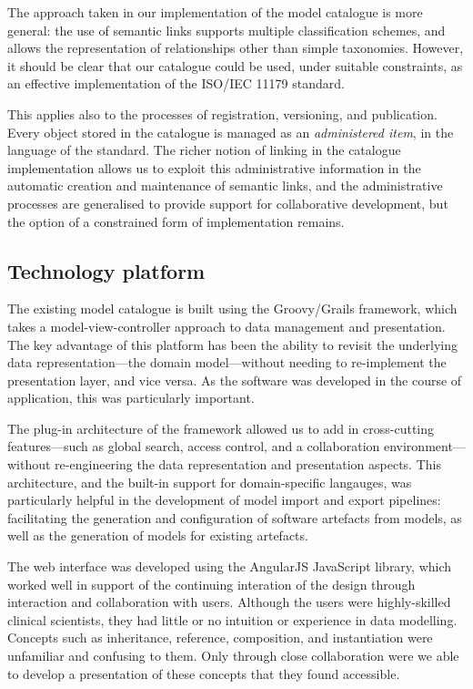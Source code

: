 The approach taken in our implementation of the model catalogue is
more general: the use of semantic links supports multiple
classification schemes, and allows the representation of relationships
other than simple taxonomies.  However, it should be clear that our
catalogue could be used, under suitable constraints, as an effective
implementation of the ISO/IEC 11179 standard. 

This applies also to the processes of registration, versioning, and
publication.  Every object stored in the catalogue is managed as an
\emph{administered item}, in the language of the standard.  The richer
notion of linking in the catalogue implementation allows us to exploit
this administrative information in the automatic creation and
maintenance of semantic links, and the administrative processes are
generalised to provide support for collaborative development, but the
option of a constrained form of implementation remains. 

\subsection{Technology platform}

The existing model catalogue is built using the Groovy/Grails
framework, which takes a model-view-controller approach to data
management and presentation.  The key advantage of this platform has
been the ability to revisit the underlying data representation---the
domain model---without needing to re-implement the presentation
layer, and vice versa.  As the software was developed in the course of
application, this was particularly important. 

The plug-in architecture of the framework allowed us to add in
cross-cutting features---such as global search, access control, and a
collaboration environment---without re-engineering the data
representation and presentation aspects.  This architecture, and the
built-in support for domain-specific langauges, was particularly
helpful in the development of model import and export pipelines: 
facilitating the generation and configuration of software artefacts
from models, as well as the generation of models for existing
artefacts.

The web interface was developed using the AngularJS JavaScript
library, which worked well in support of the continuing interation of
the design through interaction and collaboration with users.  Although
the users were highly-skilled clinical scientists, they had little or
no intuition or experience in data modelling.  Concepts such as
inheritance, reference, composition, and instantiation were unfamiliar
and confusing to them.  Only through close collaboration were we able
to develop a presentation of these concepts that they found
accessible.

